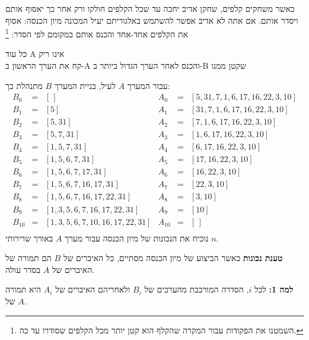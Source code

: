 כאשר משחקים קלפים, שחקן אדיב יחכה עד שכל הקלפים חולקו ורק אחר כך יאסוף אותם ויסדר אותם. אם אתה לא אדיב אפשר להשתמש באלגוריתם יעיל המכונה מיון הכנסה: אסוף את הקלפים אחד-אחד והכנס אותם במקומם לפי הסדר:%
\footnote{%
השמטנו את הפקודות עבור המקרה שהקלף הוא קטן יותר מכל הקלפים שסודרו עד כה.%
}

\medskip

\hspace*{3em}%
כל עוד A אינו ריק\\
\hspace*{6em}%
קח את הערך הראשון ב-A והכנס לאחר הערך הגדול ביותר ב-B שקטן ממנו

\medskip
עבור המערך
$A$
לעיל, בניית המערך
$B$
מתנהלת כך:
\[
\begin{array}{lll}
B_0&=&[\,]\\
B_1&=&[5]\\
B_2&=&[5,31]\\
B_3&=&[5,7,31]\\
B_4&=&[1,5,7,31]\\
B_5&=&[1,5,6,7,31]\\
B_6&=&[1,5,6,7,17,31]\\
B_7&=&[1,5,6,7,16,17,31]\\
B_8&=&[1,5,6,7,16,17,22,31]\\
B_9&=&[1,3,5,6,7,16,17,22,31]\\
B_{10}&=&[1,3,5,6,7,10,16,17,22,31]\\
\end{array}
\begin{array}{lll}
A_0&=&[5,31,7,1,6,17,16,22,3,10]\\
A_1&=&[31,7,1,6,17,16,22,3,10]\\
A_2&=&[7,1,6,17,16,22,3,10]\\
A_3&=&[1,6,17,16,22,3,10]\\
A_4&=&[6,17,16,22,3,10]\\
A_5&=&[17,16,22,3,10]\\
A_6&=&[16,22,3,10]\\
A_7&=&[22,3,10]\\
A_8&=&[3,10]\\
A_9&=&[10]\\
A_{10}&=&[\,]\\
\end{array}
\]
נוכיח את הנכונות של מיון הכנסה עבור מערך
$A$
באורך שרירותי
$n$.

\textbf{%
טענת נכונות%
}
כאשר הביצוע של מיון הכנסה מסתיים, כל האיברים של
$B$
הם תמורה של האיברים של
$A$
בסדר עולה.

\textbf{%
למה %
1:}
לכל
$i$,
הסדרה המורכבת מהערכים של
$B_i$
ולאחריהם האיברים של
$A_i$
היא תמורה של
$A$.

